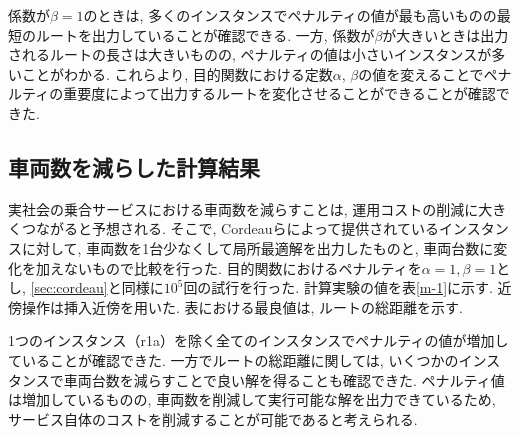 係数が$\beta=1$のときは, 多くのインスタンスでペナルティの値が最も高いものの最短のルートを出力していることが確認できる. 一方, 係数が$\beta$が大きいときは出力されるルートの長さは大きいものの, ペナルティの値は小さいインスタンスが多いことがわかる.
これらより, 目的関数における定数$\alpha$, $\beta$の値を変えることでペナルティの重要度によって出力するルートを変化させることができることが確認できた.

\subsection{車両数を減らした計算結果}
実社会の乗合サービスにおける車両数を減らすことは, 運用コストの削減に大きくつながると予想される. そこで, Cordeauらによって提供されているインスタンスに対して, 車両数を1台少なくして局所最適解を出力したものと, 車両台数に変化を加えないもので比較を行った. 目的関数におけるペナルティを$\alpha=1, \beta=1$とし, \ref{sec:cordeau}と同様に$10^5$回の試行を行った. 計算実験の値を表\ref{m-1}に示す. 近傍操作は挿入近傍を用いた. 表における最良値は, ルートの総距離を示す.

1つのインスタンス（r1a）を除く全てのインスタンスでペナルティの値が増加していることが確認できた. 一方でルートの総距離に関しては, いくつかのインスタンスで車両台数を減らすことで良い解を得ることも確認できた. ペナルティ値は増加しているものの, 車両数を削減して実行可能な解を出力できているため, サービス自体のコストを削減することが可能であると考えられる.

